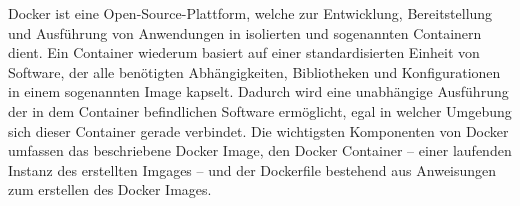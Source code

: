 Docker ist eine Open-Source-Plattform, welche zur Entwicklung, Bereitstellung und Ausführung von Anwendungen in isolierten und sogenannten Containern dient. Ein Container wiederum basiert auf einer standardisierten Einheit von Software, der alle benötigten Abhängigkeiten, Bibliotheken und Konfigurationen in einem sogenannten Image kapselt. Dadurch wird eine unabhängige Ausführung der in dem Container befindlichen Software ermöglicht, egal in welcher Umgebung sich dieser Container gerade verbindet.
Die wichtigsten Komponenten von Docker umfassen das beschriebene Docker Image, den Docker Container – einer laufenden Instanz des erstellten Imgages – und der Dockerfile bestehend aus Anweisungen zum erstellen des Docker Images.